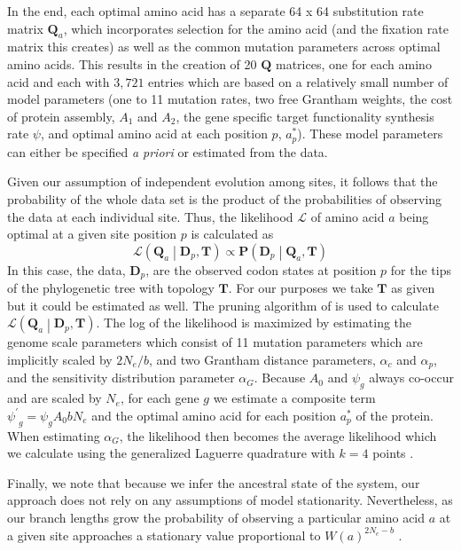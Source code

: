 \documentclass[12pt,letterpaper]{article}
\newcommand{\Ne}{\ensuremath{{N_e}}\xspace} %
\newcommand{\Lik}{\ensuremath{\mathcal{L}}\xspace}%
\newcommand{\Pmatrix}{\ensuremath{\mathbf{P}}\xspace}
\newcommand{\Tmatrix}{\ensuremath{\mathbf{T}}\xspace}
\newcommand{\Dmatrixp}{\ensuremath{\mathbf{D}_p}\xspace}
\newcommand{\Qmatrix}{\ensuremath{\mathbf{Q}}\xspace}
\newcommand{\Qmatrixa}{\ensuremath{\Qmatrix_a}\xspace}
\newcommand{\alphac}{\ensuremath{\alpha_c}\xspace}
\newcommand{\alphag}{\ensuremath{\alpha_G}\xspace}
\newcommand{\alphap}{\ensuremath{\alpha_p}\xspace}
\newcommand{\aoptp}{\ensuremath{a^*_p}\xspace}
\newcommand{\psiprime}{\ensuremath{\psi^\prime}\xspace}
\begin{document}
In the end, each optimal amino acid has a separate 64 x 64 substitution rate matrix \Qmatrixa, which incorporates selection for the amino acid (and the fixation rate matrix this creates) as well as the common mutation parameters across optimal amino acids.
This results in the creation of 20 \Qmatrix matrices, one for each amino acid and each with $3,721$ entries which are based on a relatively small number of model parameters (one to 11 mutation rates, two free Grantham weights, the cost of protein assembly, $A_1$ and $A_2$, the gene specific target functionality synthesis rate $\psi$, and optimal amino acid at each position $p$, \aoptp).
These model parameters can either be specified \emph{a priori} or  estimated from the data.


Given our assumption of independent evolution among sites, it follows that the probability of the whole data set is the product of the probabilities of observing the data at each individual site.
Thus, the likelihood $\Lik$ of amino acid $a$ being optimal at a given site position $p$ is calculated as
\begin{equation}
\Lik\left(\Qmatrixa\middle| \Dmatrixp, \Tmatrix\right) \propto \Pmatrix\left(\Dmatrixp\middle|\Qmatrixa,\Tmatrix\right)
\end{equation}
In this case, the data, $\Dmatrixp$, are the observed codon states at position $p$ for the tips of the phylogenetic tree with topology $\Tmatrix$.
For our purposes we take \Tmatrix as given but it could be estimated as well.
The pruning algorithm of \citet{Felsenstein1981} is used to calculate $\Lik\left(\Qmatrixa \middle| \Dmatrixp, \Tmatrix\right)$.
The log of the likelihood is maximized by estimating the genome scale parameters which consist of 11 mutation parameters which are implicitly scaled by $2 \Ne/b$, and two Grantham distance parameters, $\alphac$ and $\alphap$, and the sensitivity distribution parameter \alphag.
Because $A_0$ and $\psi_g$ always co-occur and are scaled by \Ne, for each gene $g$ we estimate a composite term $\psiprime_g = \psi_g A_0 b \Ne$ and the optimal amino acid for each position \aoptp of the protein.
When estimating \alphag, the likelihood then becomes the average likelihood which we calculate using the generalized Laguerre quadrature with $k = 4$ points \citep{Felsenstein2001}.


Finally, we note that because we infer the ancestral state of the system, our approach does not rely on any assumptions of model stationarity.
Nevertheless, as our branch lengths grow the probability of observing a particular amino acid $a$ at a given site approaches a stationary value proportional to $W(a)^{2 \Ne -b}$ \citep{SellaAndHirsh2005}.
\end{document}
